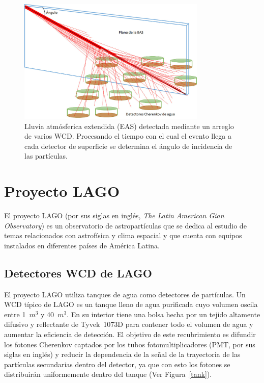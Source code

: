 \begin{figure}[H]
\centering
\includegraphics[width=0.8\textwidth]{Figs/imagenllu.jpeg} 
\caption[Lluvia atmósferica extendida (EAS)]
{Lluvia atmósferica extendida (EAS) detectada mediante un arreglo de varios WCD.
Procesando el tiempo con el cual el evento llega a cada detector de superficie se determina el ángulo de incidencia de las partículas.~\citep{hernandez2018procedimiento}}
\label{lluvia}
\end{figure}

\section{Proyecto LAGO}
El proyecto LAGO (por sus siglas en inglés, \textit{The Latin American Gian Observatory}) es un observatorio de astropartículas que se dedica al estudio de temas relacionados con astrofísica y clima espacial y que cuenta con equipos instalados en diferentes países de América Latina.

\subsection{Detectores WCD de LAGO}
El proyecto LAGO utiliza tanques de agua como detectores de partículas.
Un WCD típico de LAGO es un tanque lleno de agua purificada cuyo volumen oscila entre 1~$m^3$ y 40~$m^3$.
En su interior tiene una bolsa hecha por un tejido altamente difusivo y reflectante de Tyvek~\textregistered1073D para contener todo el volumen de agua y aumentar la eficiencia de detección.
El objetivo de este recubrimiento es difundir los fotones Cherenkov captados por los tubos fotomultiplicadores (PMT, por sus siglas en inglés) y reducir la dependencia de la señal de la trayectoria de las partículas secundarias dentro del detector, ya que con esto los fotones se distribuirán uniformemente dentro del tanque (Ver Figura~\ref{tank}).

